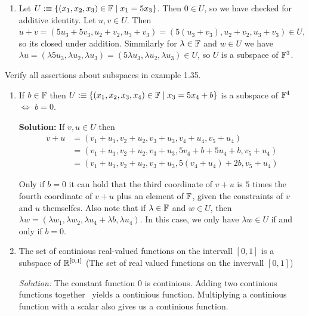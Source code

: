 \begin{xrcs}
\begin{enumerate}
    \item Let $U :\equiv \{(x_1, x_2, x_3) \in \mathbb{F} \mid x_1 = 5x_3\}$. Then $0 \in U$, so we have checked for additive identity. Let $u,v \in U$. Then $u+v= (5u_3+5v_3, u_2+v_2, u_3+v_3) = (5(u_3+v_3), u_2+v_2, u_3+v_3) \in U$, so its closed under addition. Simmilarly for $\lambda \in \mathbb{F}$ and $w \in U$ we have $\lambda u = (\lambda 5u_3, \lambda u_2, \lambda u_3) = (5 \lambda u_3, \lambda u_2, \lambda u_3) \in U$, so $U$ is a subspace of $\mathbb{F}^3$.
  \end{enumerate}

\end{xrcs}


\begin{xrcs}
  Verify all assertions about subspaces in example 1.35.

  \begin{enumerate}
    \item {
      If $b \in \mathbb{F}$ then $U :\equiv \{(x_1, x_2, x_3, x_4) \in \mathbb{F} \mid x_3 = 5x_4+b \}$ is a subspace of $\mathbb{F}^4$ $\iff$ $b=0$.

      \textbf{Solution:} If $v,u \in U$ then
      \begin{equation}
        \begin{aligned}
          v+u & = (v_1+u_1, v_2+u_2, v_3+u_3, v_4+u_4, v_5+u_4) \\
          & = (v_1+u_1, v_2+u_2, v_3+u_3, 5v_4+b+5u_4+b, v_5+u_4) \\
          & = (v_1+u_1, v_2+u_2, v_3+u_3, 5(v_4 + u_4) + 2b, v_5+u_4)
        \end{aligned}
      \end{equation}

      Only if $b=0$ it can hold that the third coordinate of $v+u$ is $5$ times the fourth coordinate of $v+u$ plus an element of $\mathbb{F}$, given the constraints of $v$ and $u$ themselfes. Also note that if $\lambda \in \mathbb{F}$ and $w \in U$, then $\lambda w = (\lambda w_1, \lambda w_2, \lambda u_4 + \lambda b, \lambda u_4)$. In this case, we only have $\lambda w \in U$ if and only if $b=0$.
    }

    \item{
      The set of continious real-valued functions on the intervall $[0,1]$ is a subspace of $\mathbb{R}^{[0,1]}$ (The set of real valued functions on the invervall $[0,1]$)

      \emph{Solution:} The constant function $0$ is continious. Adding two continious functions together ~yields a continious function. Multiplying a continious function with a scalar also gives us a continious function.
    }


\end{enumerate}
\end{xrcs}
